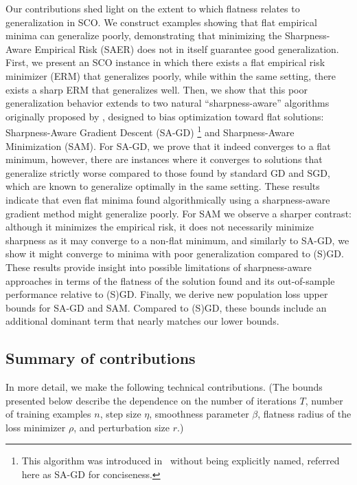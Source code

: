 \documentclass[11pt]{article}
\newcommand{\rad}{r}
\begin{document}
Our contributions shed light on the extent to which flatness relates to generalization in SCO.
We construct examples showing that flat empirical minima can generalize poorly, demonstrating that minimizing the Sharpness-Aware Empirical Risk (SAER) does not in itself guarantee good generalization.
First, we present an SCO instance in which there exists a flat empirical risk minimizer (ERM) that generalizes poorly, while within the same setting, there exists a sharp ERM that generalizes well.
Then, we show that this poor generalization behavior extends to two natural ``sharpness-aware'' algorithms originally proposed by \citet{foret2021sharpness}, designed to bias optimization toward flat solutions: Sharpness-Aware Gradient Descent (SA-GD)%
\footnote{This algorithm was introduced in~\citep{foret2021sharpness} without being explicitly named, referred here as SA-GD for conciseness.}
and Sharpness-Aware Minimization (SAM). 
For SA-GD, we prove that it indeed converges to a flat minimum, however, there are instances where it converges to solutions that generalize strictly worse compared to those found by standard GD and SGD, which are known to generalize optimally in the same setting. These results indicate that even flat minima found algorithmically using a sharpness-aware gradient method might generalize poorly.
For SAM we observe a sharper contrast: although it minimizes the empirical risk, it does not necessarily minimize sharpness as it may converge to a non-flat minimum, and similarly to SA-GD, we show it might converge to minima with poor generalization compared to (S)GD. 
These results provide insight into possible limitations of sharpness-aware approaches in terms of the flatness of the solution found and its out-of-sample performance relative to (S)GD. Finally, we derive new population loss upper bounds for SA-GD and SAM. Compared to (S)GD, these bounds include an additional dominant term that nearly matches our lower bounds. 

\subsection{Summary of contributions}

In more detail, we make the following technical contributions. 
(The bounds presented below describe the dependence on the number of iterations $T$, number of training examples $n$, step size $\eta$, smoothness parameter $\beta$, flatness radius of the loss minimizer $\rho$, and perturbation size $\rad$.)
\end{document}
